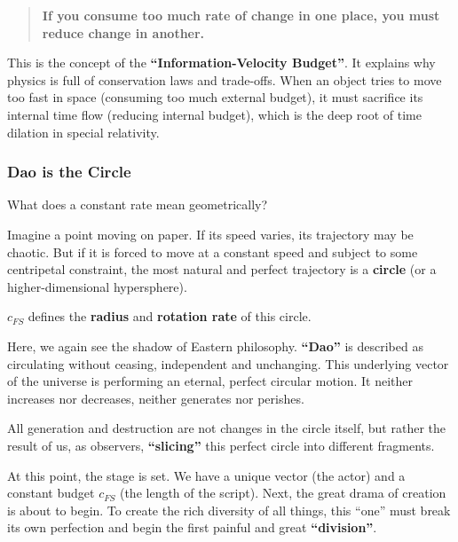 \begin{quote}
\textbf{If you consume too much rate of change in one place, you must reduce change in another.}
\end{quote}

This is the concept of the \textbf{``Information-Velocity Budget''}. It explains why physics is full of conservation laws and trade-offs. When an object tries to move too fast in space (consuming too much external budget), it must sacrifice its internal time flow (reducing internal budget), which is the deep root of time dilation in special relativity.

\subsubsection{Dao is the Circle}

What does a constant rate mean geometrically?

Imagine a point moving on paper. If its speed varies, its trajectory may be chaotic. But if it is forced to move at a constant speed and subject to some centripetal constraint, the most natural and perfect trajectory is a \textbf{circle} (or a higher-dimensional hypersphere).

$c_{FS}$ defines the \textbf{radius} and \textbf{rotation rate} of this circle.

Here, we again see the shadow of Eastern philosophy. \textbf{``Dao''} is described as circulating without ceasing, independent and unchanging. This underlying vector of the universe is performing an eternal, perfect circular motion. It neither increases nor decreases, neither generates nor perishes.

All generation and destruction are not changes in the circle itself, but rather the result of us, as observers, \textbf{``slicing''} this perfect circle into different fragments.

At this point, the stage is set. We have a unique vector (the actor) and a constant budget $c_{FS}$ (the length of the script). Next, the great drama of creation is about to begin. To create the rich diversity of all things, this ``one'' must break its own perfection and begin the first painful and great \textbf{``division''}.

